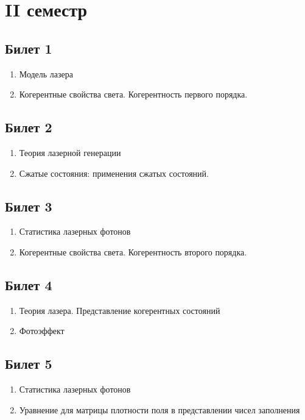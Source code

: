 \documentclass[12pt,a4paper]{article}
\begin{document}
\section*{II семестр}


\subsection*{Билет 1} 
\begin{enumerate}
\item Модель лазера
\item Когерентные свойства света.
 Когерентность первого порядка.
\end{enumerate}

\subsection*{Билет 2} 
\begin{enumerate}
\item Теория лазерной генерации
\item Сжатые состояния: применения сжатых состояний. 
\end{enumerate}

\subsection*{Билет 3} 
\begin{enumerate}
\item Статистика лазерных фотонов
\item Когерентные свойства света.
 Когерентность второго порядка.
\end{enumerate}

\subsection*{Билет 4} 
\begin{enumerate}
\item Теория лазера. Представление когерентных состояний
\item Фотоэффект
\end{enumerate}

\subsection*{Билет 5} 
\begin{enumerate}
\item Статистика лазерных фотонов
\item Уравнение для матрицы плотности поля в представлении чисел
  заполнения 
\end{enumerate}
\end{document}
